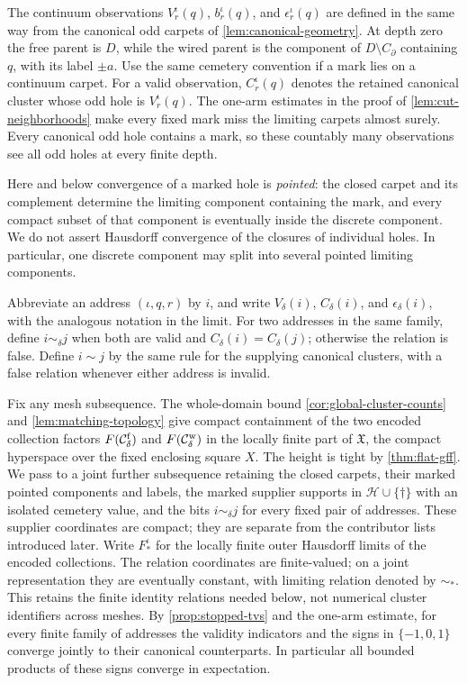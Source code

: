 The continuum observations \(V_r^\iota(q)\), \(b_r^\iota(q)\), and
\(\epsilon_r^\iota(q)\) are defined in the same way from the canonical
odd carpets of \cref{lem:canonical-geometry}. At depth zero the free
parent is \(D\), while the wired parent is the component of
\(D\setminus C_\partial\) containing \(q\), with its label \(\pm a\).
Use the same cemetery convention if a mark lies on a continuum carpet.
For a valid observation, \(C_r^\iota(q)\) denotes the retained canonical
cluster whose odd hole is \(V_r^\iota(q)\). The one-arm estimates in
the proof of \cref{lem:cut-neighborhoods} make every fixed mark miss
the limiting carpets almost surely. Every canonical odd hole contains a mark, so
these countably many observations see all odd holes at every finite
depth.

Here and below convergence of a marked hole is \emph{pointed}:
the closed carpet and its complement determine the limiting component
containing the mark, and every compact subset of that component is
eventually inside the discrete component. We do not assert Hausdorff
convergence of the closures of individual holes. In particular, one
discrete component may split into several pointed limiting components.

Abbreviate an address \((\iota,q,r)\) by \(i\), and write \(V_\delta(i)\),
\(C_\delta(i)\), and \(\epsilon_\delta(i)\), with the analogous notation
in the limit. For two addresses in the same family, define
\(i\sim_\delta j\) when both are valid and
\(C_\delta(i)=C_\delta(j)\); otherwise the relation is false.
Define \(i\sim j\) by the same rule for the supplying canonical
clusters, with a false relation whenever either address is invalid.

Fix any mesh subsequence. The whole-domain bound
\cref{cor:global-cluster-counts} and \cref{lem:matching-topology}
give compact containment of the two encoded collection factors
\(F(\mathcal C_\delta^{\rm f})\) and \(F(\mathcal C_\delta^{\rm w})\) in the
locally finite part of \(\mathfrak X\), the compact hyperspace over
the fixed enclosing square \(X\).
The height is tight by \cref{thm:flat-gff}. We pass to a joint further
subsequence retaining the closed carpets, their marked pointed
components and labels, the marked supplier supports in
\(\mathscr H\cup\{\dagger\}\) with an isolated cemetery value, and
the bits \(i\sim_\delta j\) for every fixed pair of addresses.
These supplier coordinates are compact;
they are separate from the contributor lists introduced later.
Write \(F_*^\iota\) for the locally finite outer Hausdorff limits of
the encoded collections. The relation coordinates are finite-valued;
on a joint representation they are eventually constant, with limiting
relation denoted by \(\sim_*\). This retains the finite identity
relations needed below, not numerical cluster identifiers across meshes.
By \cref{prop:stopped-tvs} and the one-arm estimate, for every finite
family of addresses the validity indicators and the signs in
\(\{-1,0,1\}\) converge jointly to their canonical counterparts.
In particular all bounded products of these signs converge in
expectation.


